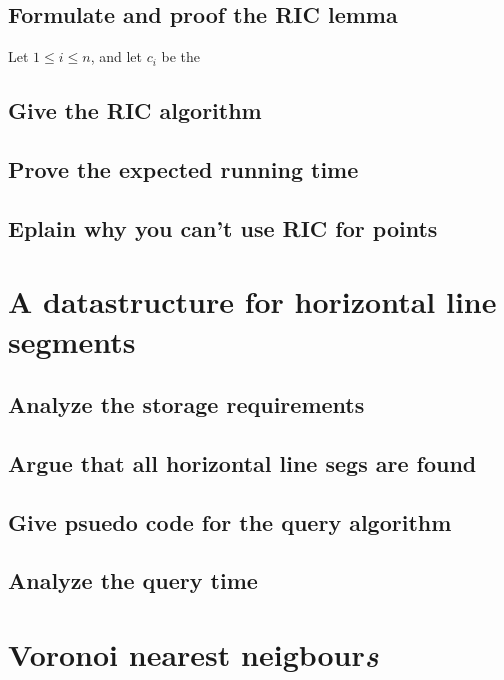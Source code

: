 \documentclass{article}
\begin{document}
\subsection{Formulate and proof the RIC lemma}
Let $1 \leq i \leq n$, and let $c_i$ be the 

\subsection{Give the RIC algorithm}

\subsection{Prove the expected running time}
\subsection{Eplain why you can't use RIC for points}
\section{A datastructure for horizontal line segments}

\subsection{Analyze the storage requirements}
\subsection{Argue that all horizontal line segs are found}
\subsection{Give psuedo code for the query algorithm}

\subsection{Analyze the query time}

\section{Voronoi nearest neigbour\emph{s}}
\end{document}
